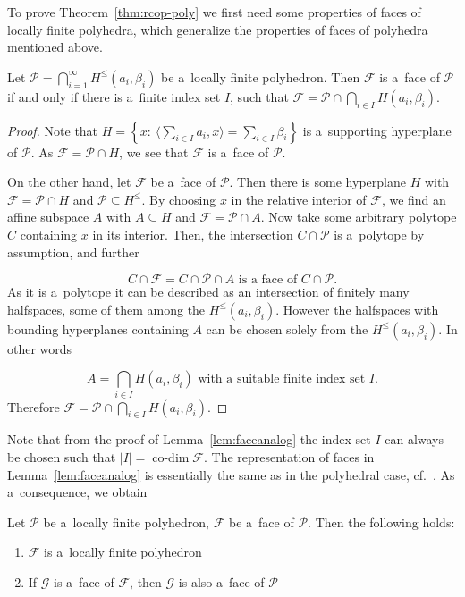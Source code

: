 \documentclass{commat}
\newcommand{\lfp}{\mathcal{P}}
\newcommand{\lfpfacef}{\mathcal{F}}
\newcommand{\lfpfaceg}{\mathcal{G}}
\begin{document}
To prove Theorem~\ref{thm:rcop-poly} we first need some properties of faces of locally finite
polyhedra, which generalize the properties of faces of polyhedra mentioned above.
\begin{lemma}\label{lem:faceanalog}
	Let \(\lfp=\bigcap_{i=1}^{\infty}H^{\leq}(a_i,\beta_i) \) be a~locally finite polyhedron.
	Then \(\lfpfacef \) is a~face of \(\lfp \) if and only if there is a~finite index set $I$,
	such that \(\lfpfacef=\lfp\cap\bigcap_{i\in I}H(a_i,\beta_i) \).
\end{lemma}
\begin{proof}
	Note that \(H=\left\{ x:\ \langle\sum_{i\in I}a_i,x\rangle = \sum_{i\in I}\beta_i \right\} \)
	is a~supporting hyperplane of \(\lfp \).
    As \(\lfpfacef=\lfp\cap H \), we see that \(\lfpfacef \) is a~face of \(\lfp \).

	On the other hand, let \(\lfpfacef \) be a~face of \(\lfp \).
	Then there is some hyperplane $H$ with \(\lfpfacef = \lfp\cap H \) and
    \(\lfp\subseteq H^{\leq} \).
	By choosing $x$ in the relative interior of \(\lfpfacef \), we find an affine subspace $A$
	with \(A \subseteq H \) and \(\lfpfacef = \lfp\cap A \).
	Now take some arbitrary polytope $C$ containing $x$ in its interior.
	Then, the intersection \(C\cap\lfp \) is a~polytope by assumption, and further
	
\[
		C\cap\lfpfacef=C\cap\lfp\cap A \text{ is a~face of } C\cap\lfp.
\]
	As it is a~polytope it can be described as an intersection of finitely many halfspaces, some of
	them among the \(H^{\leq}(a_i, \beta_i) \).
	However the halfspaces with bounding hyperplanes containing $A$ can be chosen solely from the
	\(H^{\leq}(a_i, \beta_i) \).
	In other words
	
\[
		A = \bigcap_{i\in I}H(a_i, \beta_i) \text{ with a~suitable finite index set } I.
\]
	Therefore
	\(\lfpfacef = \lfp\cap\bigcap_{i\in I}H(a_i, \beta_i). \)
\end{proof}
Note that from the proof of Lemma~\ref{lem:faceanalog} the index set $I$ can always be chosen such
that \(|I| = \operatorname{co-dim}\lfpfacef \).
The representation of faces in Lemma~\ref{lem:faceanalog} is essentially the same as in the
polyhedral case, cf.~\cite[Section 8.3]{schrijver-1986}.
As a~consequence, we obtain
\begin{corollary}\label{cor:faceoflfp}
	Let \(\lfp \) be a~locally finite polyhedron, \(\lfpfacef \) be a~face of \(\lfp \).
	Then the following holds:
	
\begin{enumerate}
		\item \(\lfpfacef \) is a~locally finite polyhedron
		\item If \(\lfpfaceg \) is a~face of \(\lfpfacef \),
			then \(\lfpfaceg \) is also a~face of \(\lfp \)
	
\end{enumerate}
\end{corollary}
\end{document}
